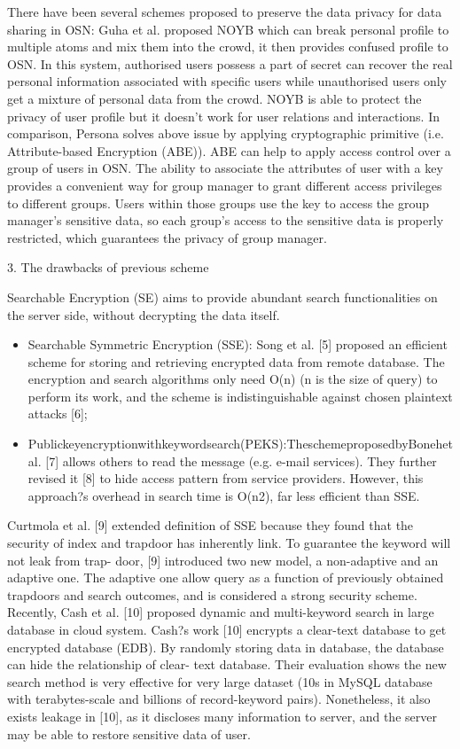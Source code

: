 There have been several schemes proposed to preserve the data privacy for data sharing in OSN: Guha et al. proposed NOYB \cite{guha2008noyb} which can break personal profile to multiple atoms and mix them into the crowd, it then provides confused profile to OSN. In this system, authorised users possess a part of secret can recover the real personal information associated with specific users while unauthorised users only get a mixture of personal data from the crowd. NOYB is able to protect the privacy of user profile but it doesn't work for user relations and interactions. 
In comparison, Persona \cite{baden2009persona} solves above issue by applying cryptographic primitive (i.e. Attribute-based Encryption (ABE)). ABE can help to apply access control over a group of users in OSN. The ability to associate the attributes of user with a key provides a convenient way for group manager to grant different access privileges to different groups. Users within those groups use the key to access the group manager's sensitive data, so each group's access to the sensitive data is properly restricted, which guarantees the privacy of group manager. 

3. The drawbacks of previous scheme

Searchable Encryption (SE) aims to provide abundant search functionalities on the server side, without decrypting the data itself.
\begin{itemize}
\item Searchable Symmetric Encryption (SSE): Song et al. [5] proposed an efficient scheme for storing and retrieving encrypted data from remote database. The encryption and search algorithms only need O(n) (n is the size of query) to perform its work, and the scheme is indistinguishable against chosen plaintext attacks [6];
\item Publickeyencryptionwithkeywordsearch(PEKS):TheschemeproposedbyBonehet al. [7] allows others to read the message (e.g. e-mail services). They further revised it [8] to hide access pattern from service providers. However, this approach?s overhead in search time is O(n2), far less efficient than SSE.
\end{itemize}
Curtmola et al. [9] extended definition of SSE because they found that the security of index and trapdoor has inherently link. To guarantee the keyword will not leak from trap- door, [9] introduced two new model, a non-adaptive and an adaptive one. The adaptive one allow query as a function of previously obtained trapdoors and search outcomes, and is considered a strong security scheme.
Recently, Cash et al. [10] proposed dynamic and multi-keyword search in large database in cloud system. Cash?s work [10] encrypts a clear-text database to get encrypted database (EDB). By randomly storing data in database, the database can hide the relationship of clear- text database. Their evaluation shows the new search method is very effective for very large dataset (10s in MySQL database with terabytes-scale and billions of record-keyword pairs). Nonetheless, it also exists leakage in [10], as it discloses many information to server, and the server may be able to restore sensitive data of user.


